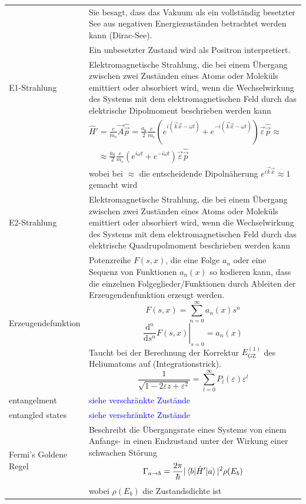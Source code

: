 \documentclass{article}
\newcommand{\diff}{\mathrm{d}}
\begin{document}
\begin{xltabular}{\linewidth}{p{6cm}|X}
		& Sie besagt, dass das Vakuum als ein vollständig besetzter See aus negativen Energiezuständen betrachtet werden kann (Dirac-See).\\
		& Ein unbesetzter Zustand wird als Positron interpretiert.\\
	\hline
		E1-Strahlung & Elektromagnetische Strahlung, die bei einem Übergang zwischen zwei Zuständen eines Atoms oder Moleküls emittiert oder absorbiert wird, wenn die Wechselwirkung des Systems mit dem elektromagnetischen Feld durch das elektrische Dipolmoment beschrieben werden kann\\
		& $\hat{H}' = \frac{e}{m_e}\vec{A}\hat{\vec{p}} = \frac{a_0}{2}\frac{e}{m_e} (e^{i(\vec{k}\vec{x} - \omega t)} + e^{-i(\vec{k}\vec{x} - \omega t)}) \vec{\varepsilon}\hat{\vec{p}} \approx $ \\
		& $\phantom{\hat{H}'} \approx \frac{a_0}{2}\frac{e}{m_e} (e^{i\omega t} + e^{-i\omega t}) \vec{\varepsilon}\hat{\vec{p}}$ \\
		& \textcolor{gruen}{wobei bei $\approx$ die entscheidende Dipolnäherung $e^{i\vec{k}\vec{x}} \approx 1$ gemacht wird} \\
	\hline
		E2-Strahlung & Elektromagnetische Strahlung, die bei einem Übergang zwischen zwei Zuständen eines Atoms oder Moleküls emittiert oder absorbiert wird, wenn die Wechselwirkung des Systems mit dem elektromagnetischen Feld durch das elektrische Quadrupolmoment beschrieben werden kann \\
	\hline
		Erzeugendefunktion & Potenzreihe $F(s,x)$, die eine Folge $a_n$ oder eine Sequenz von Funktionen $a_n(x)$ so kodieren kann, dass die einzelnen Folgeglieder/Funktionen durch Ableiten der Erzeugendenfunktion erzeugt werden.
			$$F(s,x) = \sum_{n=0}^\infty a_n(x) s^n$$
			$$\left.\frac{\diff^n}{\diff s^n} F(s,x)\right|_{s=0} = a_n(x)$$
		Taucht bei der Berechnung der Korrektur $E_{\text{GZ}}^{(1)}$ des Heliumatoms auf (Integrationstrick).
			$$\frac{1}{\sqrt{1 - 2\varepsilon z + \varepsilon^2}} = \sum_{l=0}^\infty P_l(\varepsilon) \varepsilon^l$$\\
	\hline
		entangelment & \textcolor{blue}{siehe verschränkte Zustände} \\
	\hline
		entangled states & \textcolor{blue}{siehe verschränkte Zustände} \\
	\hline
		Fermi's Goldene Regel & Beschreibt die Übergangsrate eines Systems von einem Anfangs- in einen Endzustand unter der Wirkung einer schwachen Störung
			$$\Gamma_{a\to b} = \frac{2\pi}{\hbar} |\braket{b | \hat{H}' | a}|^2 \rho(E_b)$$
		wobei $\rho(E_b)$ die Zustandsdichte ist \\

\end{xltabular}
\end{document}
